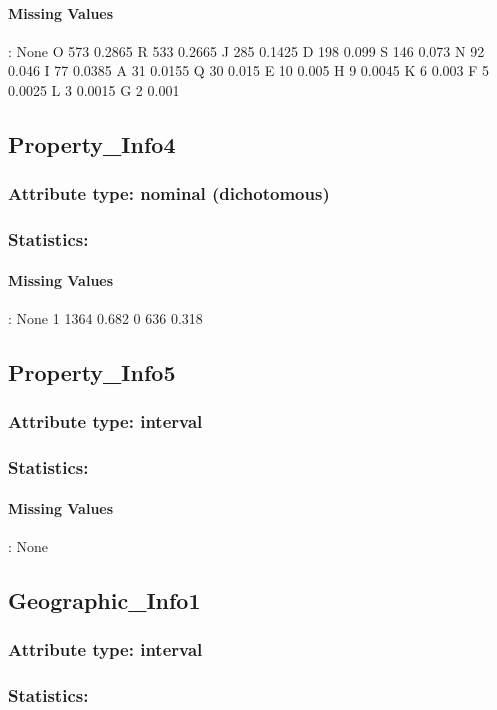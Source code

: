 \paragraph{Missing Values}: None
O	573	0.2865
R	533	0.2665
J	285	0.1425
D	198	0.099
S	146	0.073
N	92	0.046
I	77	0.0385
A	31	0.0155
Q	30	0.015
E	10	0.005
H	9	0.0045
K	6	0.003
F	5	0.0025
L	3	0.0015
G	2	0.001

\subsection{Property\_Info4}
\subsubsection{Attribute type: nominal (dichotomous)}
\subsubsection{Statistics: }
\paragraph{Missing Values}: None
1	1364	0.682
0	636	0.318

\subsection{Property\_Info5}
\subsubsection{Attribute type: interval}
\subsubsection{Statistics: }
\paragraph{Missing Values}: None

\subsection{Geographic\_Info1}
\subsubsection{Attribute type: interval}
\subsubsection{Statistics: }

